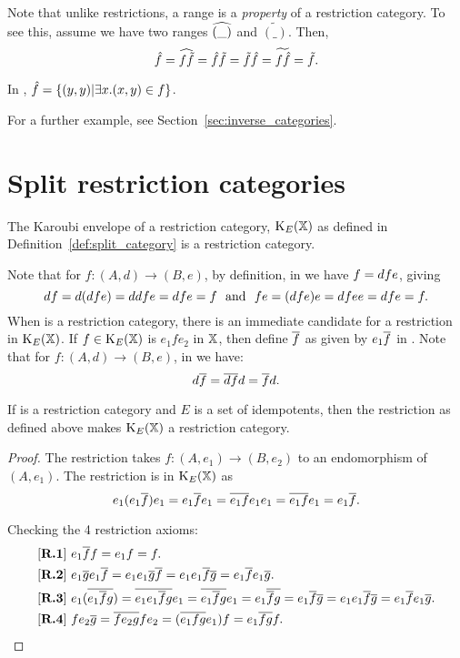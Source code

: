 Note that unlike restrictions, a range is a \emph{property} of a restriction category. To see
this, assume we have two ranges $\widehat{(\_)}$ and $\widetilde{(\_)}$. Then,
\[\hat{f}=\widehat{f \tilde{f}}=\hat{f} \tilde{f}=\tilde{f} \hat{f}=\widetilde{f \hat{f}}=\tilde{f}.\]

\begin{example}\label{ex:ranges}
   In \pinj, $\hat{f} = \{(y,y) | \exists x. (x,y) \in f\}$.
\end{example}

For a further example, see Section~\ref{sec:inverse_categories}.
\section{Split restriction categories} %
\label{sub:split_restriction_categories}

The Karoubi envelope of a restriction category, $\text{K}_{E}(\mathbb{X})$ as defined in
Definition~\ref{def:split_category} is a restriction category.

Note that for $f:(A,d)\to(B,e)$, by definition, in \X we have $f=d\hspace{0.1pt} f e$, giving
\[
  d\hspace{0.1pt} f = d(d\hspace{0.1pt} f e) = d\hspace{0.1pt} d\hspace{0.1pt} f e = d\hspace{0.1pt} f e =f\
  \text{ and }\  f e = (d\hspace{0.1pt} f e)e = d\hspace{0.1pt} f e\hspace{0.1pt} e = d\hspace{0.1pt} f e = f.
\]
When \X is a restriction category, there is an immediate candidate for a restriction in
$\text{K}_{E}(\mathbb{X})$. If $f\in\text{K}_{E}(\mathbb{X})$ is $e_1 f e_2$ in $\mathbb{X}$, then define $\overline{f}$ as
given by $e_1 \overline{f}$ in \X. Note that for $f:(A,d)\to(B,e)$, in \X we have:
\[
  d\hspace{0.1pt}\overline{f} = \overline{d\hspace{0.1pt} f} d = \overline{f} d.
\]

\begin{proposition}\label{prop:spleisarestrictioncat}
  If \X is a restriction category and $E$ is a set of idempotents, then
  the restriction as defined above makes $\text{K}_{E}(\mathbb{X})$ a restriction category.
\end{proposition}
\begin{proof}
  The restriction takes $f:(A,e_1)\to (B,e_2)$ to an endomorphism of $(A,e_1)$. The restriction
  is in $\text{K}_{E}(\mathbb{X})$ as
  \[
    e_1 (e_1\overline{f}) e_1 = e_1 \overline{f} e_1
    = \overline{e_1 f} e_1 e_1
    = \overline{e_1 f} e_1
    = e_1 \overline{ f}.
  \]

  Checking the 4 restriction axioms:
  \begin{align*}
    &[\text{{\bfseries R.1}}]\  e_1 \overline{f} f
    = e_1 f = f.\\
    & [\text{{\textbf{R.2}}}]\  e_1\overline{g}  e_1\overline{f}
    = e_1 e_1\overline{g}  \overline{f} = e_1 e_1\overline{f}  \overline{g}
    = e_1\overline{f}  e_1\overline{g}.\\
    & [\text{{\textbf{R.3}}}]\  e_1 (\overline{e_1 \overline{f}  g})
    =  \overline{e_1 e_1 \overline{f} g} e_1
    =  \overline{e_1 \overline{f} g} e_1
    =  e_1 \overline{\overline{f} g}
    = e_1 \overline{f}\overline{g}
    = e_{1}e_{1}\overline{f}\overline{g}
    = e_1 \overline{f}e_1\overline{g}.\\
    &[\text{{\textbf{R.4}}}]\ f e_2 \overline{g}
    = \overline{ f e_2 g} f e_2
    = (\overline{e_1  f g} e_1)  f
    = e_1 \overline{  f  g}  f.
  \end{align*}
\end{proof}

